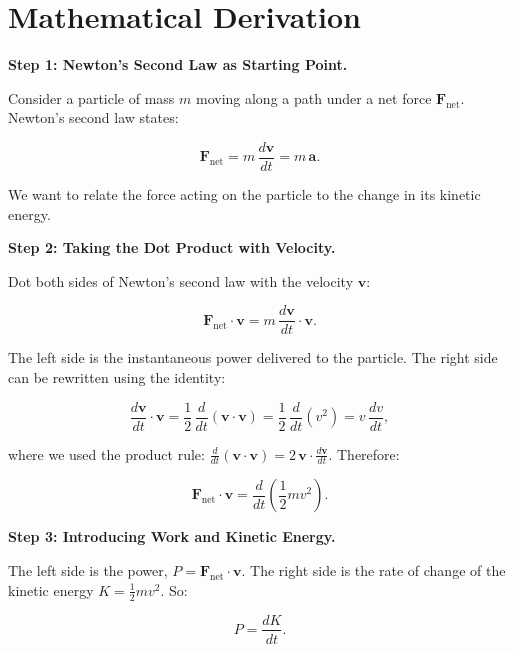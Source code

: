 \section*{Mathematical Derivation}

\textbf{Step 1: Newton's Second Law as Starting Point.}

Consider a particle of mass $m$ moving along a path under a net force $\mathbf{F}_{\text{net}}$. Newton's second law states:

\begin{equation}
\mathbf{F}_{\text{net}} = m\,\frac{d\mathbf{v}}{dt} = m\,\mathbf{a}.
\end{equation}

We want to relate the force acting on the particle to the change in its kinetic energy.

\textbf{Step 2: Taking the Dot Product with Velocity.}

Dot both sides of Newton's second law with the velocity $\mathbf{v}$:

\begin{equation}
\mathbf{F}_{\text{net}}\cdot\mathbf{v} = m\,\frac{d\mathbf{v}}{dt}\cdot\mathbf{v}.
\end{equation}

The left side is the instantaneous power delivered to the particle. The right side can be rewritten using the identity:

\begin{equation}
\frac{d\mathbf{v}}{dt}\cdot\mathbf{v} = \frac{1}{2}\,\frac{d}{dt}(\mathbf{v}\cdot\mathbf{v}) = \frac{1}{2}\,\frac{d}{dt}(v^2) = v\,\frac{dv}{dt},
\end{equation}

where we used the product rule: $\frac{d}{dt}(\mathbf{v}\cdot\mathbf{v}) = 2\,\mathbf{v}\cdot\frac{d\mathbf{v}}{dt}$. Therefore:

\begin{equation}
\mathbf{F}_{\text{net}}\cdot\mathbf{v} = \frac{d}{dt}\!\left(\frac{1}{2}mv^2\right).
\end{equation}

\textbf{Step 3: Introducing Work and Kinetic Energy.}

The left side is the power, $P = \mathbf{F}_{\text{net}}\cdot\mathbf{v}$. The right side is the rate of change of the kinetic energy $K = \frac{1}{2}mv^2$. So:

\begin{equation}
P = \frac{dK}{dt}.
\end{equation}

